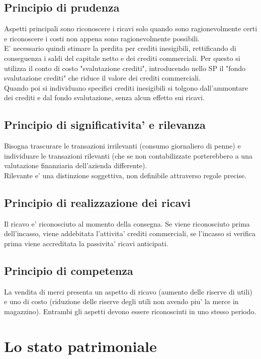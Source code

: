 \documentclass{report}
\begin{document}
	\subsection{Principio di prudenza}
	Aspetti principali sono riconoscere i ricavi solo quando sono ragionevolmente certi e riconoscere i costi non appena sono ragionevolmente possibili.\medskip \\E' necessario quindi stimare la perdita per crediti inesigibili, rettificando di conseguenza i saldi del capitale netto e dei crediti commerciali. Per questo si utilizza il conto di costo "svalutazione crediti", introducendo nello SP il "fondo svalutazione crediti" che riduce il valore dei crediti commerciali.\medskip \\Quando poi si individuano specifici crediti inesigibili si tolgono dall'ammontare dei crediti e dal fondo svalutazione, senza alcun effetto sui ricavi.
	\subsection{Principio di significativita' e rilevanza}
	Bisogna trascurare le transazioni irrilevanti (consumo giornaliero di penne) e individuare le transazioni rilevanti (che se non contabilizzate porterebbero a una valutazione finanziaria dell'azienda differente).\medskip \\Rilevante e' una distinzione soggettiva, non definibile attraverso regole precise.
	\subsection{Principio di realizzazione dei ricavi}
	Il ricavo e' riconosciuto al momento della consegna. Se viene riconosciuto prima dell'incasso, viene addebitata l'attivita' crediti commerciali, se l'incasso si verifica prima viene accreditata la passivita' ricavi anticipati.
	\subsection{Principio di competenza}
	La vendita di merci presenta un aspetto di ricavo (aumento delle riserve di utili) e uno di costo (riduzione delle riserve degli utili non avendo piu' la merce in magazzino). Entrambi gli aspetti devono essere riconosciuti in uno stesso periodo.
	\section{Lo stato patrimoniale}
\end{document}
